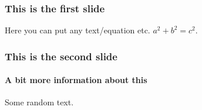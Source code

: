 \documentclass{beamer}
\begin{document}
	\begin{frame}
		\frametitle{This is the first slide}
		Here you can put any text/equation etc. 
		$a^2 + b^2 = c^2$.		
	\end{frame}
	\begin{frame}
		\frametitle{This is the second slide}
		\framesubtitle{A bit more information about this}
		Some random text.		
	\end{frame}
\end{document}
